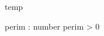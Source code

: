 \documentclass[11pt,a4paper]{article}
\begin{document}
\begin{class}{temp}
  \begin{axdef}
    perim : number
  \where
    perim > 0
  \end{axdef}
\end{class}
\end{document}
